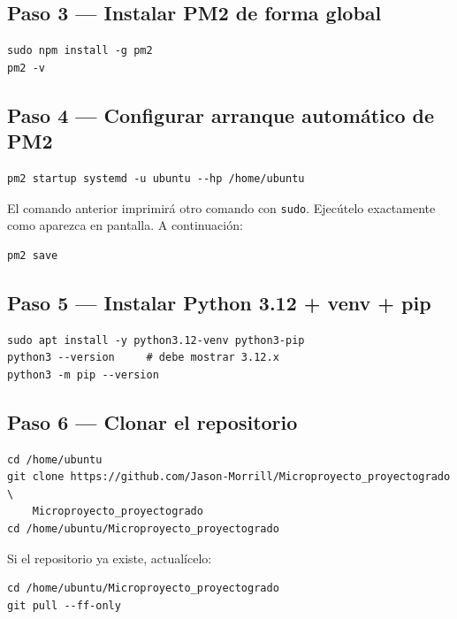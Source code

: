 \documentclass[11pt]{article}
\begin{document}
\subsection{Paso 3 — Instalar PM2 de forma global}

\begin{lstlisting}
sudo npm install -g pm2
pm2 -v
\end{lstlisting}

\subsection{Paso 4 — Configurar arranque automático de PM2}

\begin{lstlisting}
pm2 startup systemd -u ubuntu --hp /home/ubuntu
\end{lstlisting}

El comando anterior imprimirá otro comando con \texttt{sudo}. Ejecútelo
exactamente como aparezca en pantalla. A continuación:

\begin{lstlisting}
pm2 save
\end{lstlisting}

\subsection{Paso 5 — Instalar Python 3.12 + venv + pip}

\begin{lstlisting}
sudo apt install -y python3.12-venv python3-pip
python3 --version     # debe mostrar 3.12.x
python3 -m pip --version
\end{lstlisting}

\subsection{Paso 6 — Clonar el repositorio}

\begin{lstlisting}
cd /home/ubuntu
git clone https://github.com/Jason-Morrill/Microproyecto_proyectogrado \
    Microproyecto_proyectogrado
cd /home/ubuntu/Microproyecto_proyectogrado
\end{lstlisting}

Si el repositorio ya existe, actualícelo:

\begin{lstlisting}
cd /home/ubuntu/Microproyecto_proyectogrado
git pull --ff-only
\end{lstlisting}
\end{document}
